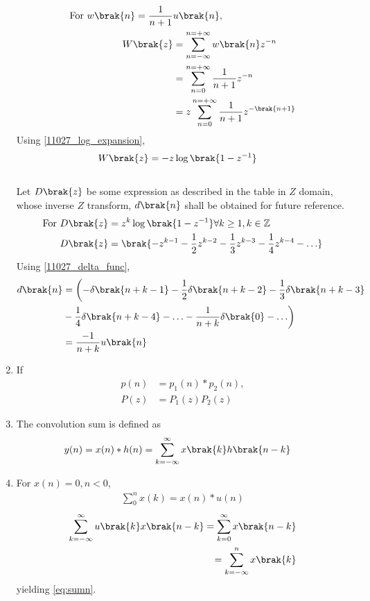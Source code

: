 \begin{enumerate}[label=\thesubsection.\arabic*,ref=\thesubsection.\theenumi]
\begin{align}
	\notag \text{For } w\brak{n} = \frac{1}{n+1}&u\brak{n},\\
	W\brak{z} &=\sum_{n= -\infty}^{n= +\infty} w\brak{n}z^{-n}\\
	&= \sum_{n = 0}^{n = +\infty} \frac{1}{n+1}z^{-n}\\
	&= z\sum_{n = 0}^{n = +\infty} \frac{1}{n+1}z^{-\brak{n+1}} 
\end{align}
Using \eqref{11027_log_expansion},
\begin{align}
	W\brak{z}&= -z\log\brak{1-z^{-1}} \label{11027_when_c_equals_1}	
\end{align}
\\
Let $D\brak{z}$ be some expression as described in the table in $Z$ domain, whose inverse $Z$ transform, $d\brak{n}$ shall be obtained for future reference.\\

\begin{align}
	\notag \text{For } D\brak{z}&= z^{k}\log\brak{1-z^{-1}} \forall k \geq 1, k\in \mathbb{Z}\\
	D\brak{z}&= \brak{-z^{k-1} - \frac{1}{2}z^{k-2} - \frac{1}{3}z^{k-3} - \frac{1}{4}z^{k-4} - \ldots}
\end{align}
Using \eqref{11027_delta_func},
\begin{align}
	d\brak{n} &= \biggl(-\delta\brak{n+k-1}  -\frac{1}{2}\delta\brak{n+k-2}  -\frac{1}{3}\delta\brak{n+k-3} \notag \\ &-\frac{1}{4}\delta\brak{n+k-4} - \ldots - \frac{1}{n+k}\delta\brak{0}-\ldots\biggr)\\
	&= \frac{-1}{n+k} u\brak{n} \label{11027_eq_log}
\end{align}
\item If 
\begin{align}
	p(n) &= p_1(n)* p_2(n),
	\\
	P(z)&=P_1(z)P_2(z)
\label{eq:prodz}
\end{align}
\item The convolution sum is defined as
\begin{align}
	y(n) &= x(n)* h(n) = \sum_{k=-\infty}^{\infty}x\brak{k}h\brak{n-k}
	\label{eq:conv}
\end{align}
\item For 
$x(n) = 0, n < 0$,
	\begin{align}
	\sum_{0}^{n}x(k) = x(n)*u(n)
	\label{eq:sumn}
	\end{align}
	\solution 
\begin{align}
	  \sum_{k=-\infty}^{\infty}u\brak{k}x\brak{n-k}
	 = \sum_{k=0}^{\infty}x\brak{n-k}
	 \\
	 = \sum_{k=-\infty}^{n}x\brak{k}
\end{align}
yielding 
	\eqref{eq:sumn}.
\end{enumerate}
